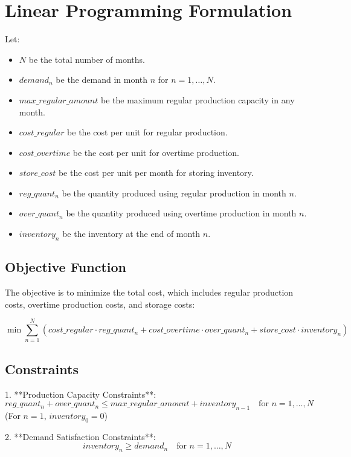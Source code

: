 \documentclass{article}
\begin{document}
\section*{Linear Programming Formulation}

Let:
\begin{itemize}
    \item \( N \) be the total number of months.
    \item \( demand_n \) be the demand in month \( n \) for \( n = 1, \ldots, N \).
    \item \( max\_regular\_amount \) be the maximum regular production capacity in any month.
    \item \( cost\_regular \) be the cost per unit for regular production.
    \item \( cost\_overtime \) be the cost per unit for overtime production.
    \item \( store\_cost \) be the cost per unit per month for storing inventory.
    \item \( reg\_quant_n \) be the quantity produced using regular production in month \( n \).
    \item \( over\_quant_n \) be the quantity produced using overtime production in month \( n \).
    \item \( inventory_n \) be the inventory at the end of month \( n \).
\end{itemize}

\subsection*{Objective Function}

The objective is to minimize the total cost, which includes regular production costs, overtime production costs, and storage costs:

\[
\min \sum_{n=1}^{N} \left( cost\_regular \cdot reg\_quant_n + cost\_overtime \cdot over\_quant_n + store\_cost \cdot inventory_n \right)
\]

\subsection*{Constraints}

1. **Production Capacity Constraints**:
   \[
   reg\_quant_n + over\_quant_n \leq max\_regular\_amount + inventory_{n-1} \quad \text{for } n = 1, \ldots, N
   \]
   (For \( n = 1 \), \( inventory_0 = 0 \))

2. **Demand Satisfaction Constraints**:
   \[
   inventory_n \geq demand_n \quad \text{for } n = 1, \ldots, N
   \]
\end{document}
